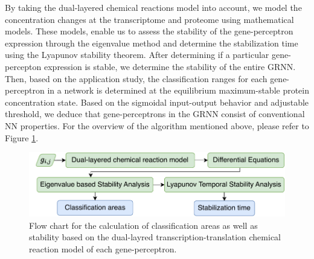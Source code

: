 \documentclass[twocolumn]{biophys-new}
\begin{document}
{{By taking the dual-layered chemical reactions model into account, we model the concentration changes at the transcriptome and proteome using mathematical models. These models, enable us to assess the stability of the gene-perceptron expression through the eigenvalue method and determine the  stabilization time using the Lyapunov stability theorem. %
After determining if a particular gene-percepton expression is stable, we determine the stability of the entire GRNN. Then, based on the application study, the classification ranges for each gene-perceptron in a network is determined at the equilibrium maximum-stable protein concentration state. Based on the sigmoidal input-output behavior and adjustable threshold, we deduce that gene-perceptrons in the GRNN consist of conventional NN properties.
 For the overview of the algorithm mentioned above, please refer to Figure \ref{fig: flow_chart_summary}. 





\begin{figure}[!t] %
\centering
\includegraphics[width=\linewidth]{figures/flow_chart_summary.pdf}
\caption{Flow chart for the calculation of classification areas as well as stability based on the dual-layred transcription-translation chemical reaction model of each gene-perceptron. \vspace{1em}}
\label{fig: flow_chart_summary}
\end{figure}


}}
\end{document}
